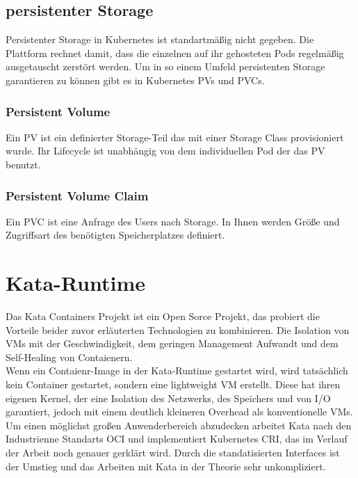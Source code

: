 \subsection{persistenter Storage}
Persistenter Storage in Kubernetes ist standartmäßig nicht gegeben. 
Die Plattform rechnet damit, dass die einzelnen auf ihr gehosteten Pods regelmäßig ausgetauscht zerstört werden. 
Um in so einem Umfeld persistenten Storage garantieren zu können gibt es in Kubernetes \ac{PV}s und \ac{PVC}s.

\subsubsection{Persistent Volume}
Ein \ac{PV} ist ein definierter Storage-Teil das mit einer Storage Class provisioniert wurde.
Ihr Lifecycle ist unabhängig von dem individuellen Pod der das \ac{PV} benutzt.

\subsubsection{Persistent Volume Claim}
Ein \ac{PVC} ist eine Anfrage des Users nach Storage.
In Ihnen werden Größe und Zugriffsart des benötigten Speicherplatzes definiert. 


\section{Kata-Runtime}
Das Kata Containers Projekt ist ein Open Sorce Projekt, das probiert die Vorteile beider zuvor erläuterten Technologien zu kombinieren.
Die Isolation von \ac{VM}s mit der Geschwindigkeit, dem geringen Management Aufwandt und dem Self-Healing von Contaienern.
\\
Wenn ein Contaienr-Image in der Kata-Runtime gestartet wird, wird tatsächlich kein Container gestartet, sondern eine lightweight \ac{VM} erstellt.
Diese hat ihren eigenen Kernel, der eine Isolation des Netzwerks, des Speichers und von \ac{I/O} garantiert, jedoch mit einem deutlich kleineren Overhead als konventionelle \ac{VM}s.
Um einen möglichst großen Anwenderbereich abzudecken arbeitet Kata nach den Industrienne Standarts \ac{OCI} und implementiert Kubernetes \ac{CRI}, das im Verlauf der Arbeit noch genauer gerklärt wird. 
Durch die standatisierten Interfaces ist der Umstieg und das Arbeiten mit Kata in der Theorie sehr unkompliziert. \cite{kata}

